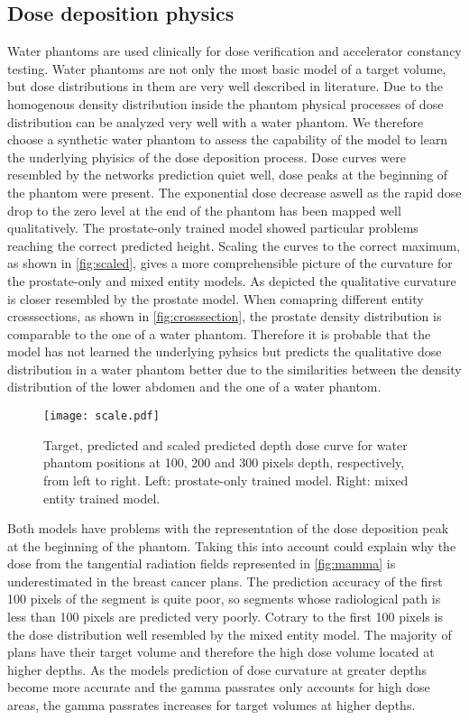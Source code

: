 \subsection{Dose deposition physics}

Water phantoms are used clinically for dose verification and accelerator constancy testing.
Water phantoms are not only the most basic model of a target volume, but dose distributions in them are very well described in literature.
Due to the homogenous density distribution inside the phantom physical processes of dose distribution can be analyzed very well with a water phantom.
We therefore choose a synthetic water phantom to assess the capability of the model to learn the underlying phyisics of the dose deposition process.
Dose curves were resembled by the networks prediction quiet well, dose peaks at the beginning of the phantom were present. 
The exponential dose decrease aswell as the rapid dose drop to the zero level at the end of the phantom has been mapped well qualitatively.
The prostate-only trained model showed particular problems reaching the correct predicted height.
Scaling the curves to the correct maximum, as shown in \autoref{fig:scaled}, gives a more comprehensible picture of the curvature for the prostate-only and mixed entity models.
As depicted the qualitative curvature is closer resembled by the prostate model. 
When comapring different entity crosssections, as shown in \autoref{fig:crosssection}, the prostate density distribution is comparable to the one of a water phantom. 
Therefore it is probable that the model has not learned the underlying pyhsics but predicts the qualitative dose distribution in a water phantom better due to the similarities between the density distribution of the lower abdomen and the one of a water phantom.

\begin{figure}
    \centering
    \texttt{[image: scale.pdf]}
    \caption{
        Target, predicted and scaled predicted depth dose curve for water phantom positions at 100, 200 and 300 pixels depth, respectively, from left to right. Left: prostate-only trained model. Right: mixed entity trained model. 
    }\label{fig:scaled}
\end{figure}

Both models have problems with the representation of the dose deposition peak at the beginning of the phantom.
Taking this into account could explain why the dose from the tangential radiation fields represented in \autoref{fig:mamma} is underestimated in the breast cancer plans.
The prediction accuracy of the first 100 pixels of the segment is quite poor, so segments whose radiological path is less than 100 pixels are predicted very poorly.
Cotrary to the first 100 pixels is the dose distribution well resembled by the mixed entity model.
The majority of plans have their target volume and therefore the high dose volume located at higher depths.
As the models prediction of dose curvature at greater depths become more accurate and the gamma passrates only accounts for high dose areas, the gamma passrates increases for target volumes at higher depths.

